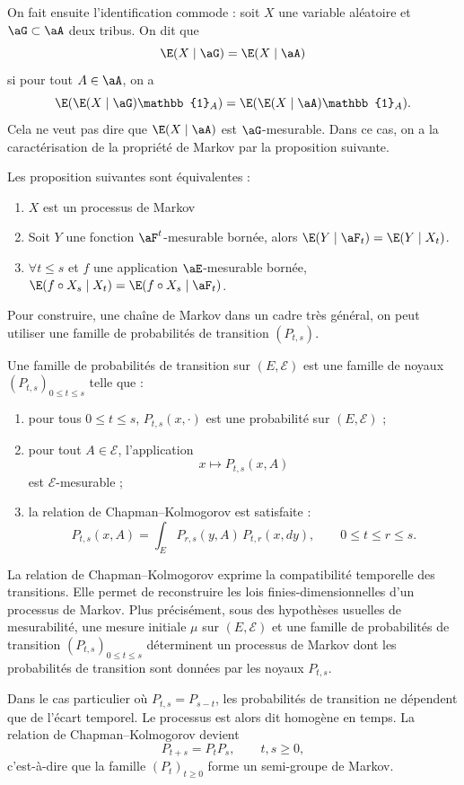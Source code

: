 On fait ensuite l'identification commode : soit $X$ une variable aléatoire et $\aG \subset \aA$ deux tribus. On dit que
\[
	\E(X \mid \aG) = \E(X \mid \aA)
\]
si pour tout $A \in \aA$, on a
\[
	\E(\E(X \mid \aG)\mathbb{1}_A) = \E(\E(X \mid \aA)\mathbb{1}_A).
\]
Cela ne veut pas dire que $\E(X \mid \aA)$ est $\aG$-mesurable. Dans ce cas, on a la caractérisation de la propriété de Markov par la proposition suivante.

\begin{prop}{}{}
	Les proposition suivantes sont équivalentes :
	\begin{enumerate}
		\item $X$ est un processus de Markov
		\item Soit $Y$ une fonction $\aF^t$-mesurable bornée, alors $\E(Y \mid \aF_t) = \E(Y \mid X_t)$.
		\item $\forall t \le s$ et $f$ une application $\aE$-mesurable bornée, $\E(f\circ X_s \mid X_t) = \E(f\circ X_s \mid \aF_t)$.
	\end{enumerate}
\end{prop}

Pour construire, une chaîne de Markov dans un cadre très général, on peut utiliser une famille de probabilités de transition $(P_{t,s})$.

\begin{defn}{}{}
	Une famille de probabilités de transition sur $(E,\mathcal E)$ est une famille de noyaux
	$(P_{t,s})_{0\le t\le s}$
	telle que :

	\begin{enumerate}
		\item pour tous $0\le t\le s$, $P_{t,s}(x,\cdot)$ est une probabilité sur $(E,\mathcal E)$ ;

		\item pour tout $A\in\mathcal E$, l'application
		      \[
			      x\longmapsto P_{t,s}(x,A)
		      \]
		      est $\mathcal E$-mesurable ;

		\item la relation de Chapman--Kolmogorov est satisfaite :
		      \[
			      P_{t,s}(x,A)
			      =
			      \int_E P_{r,s}(y,A)\,P_{t,r}(x,dy),
			      \qquad 0\le t\le r\le s.
		      \]
	\end{enumerate}
\end{defn}

La relation de Chapman--Kolmogorov exprime la compatibilité temporelle des transitions. Elle permet de reconstruire les lois finies-dimensionnelles d'un processus de Markov. Plus précisément, sous des hypothèses usuelles de mesurabilité, une mesure initiale $\mu$ sur $(E,\mathcal E)$ et une famille de probabilités de transition $(P_{t,s})_{0\le t\le s}$ déterminent un processus de Markov dont les probabilités de transition sont données par les noyaux $P_{t,s}$.

\medskip

Dans le cas particulier où $P_{t,s}=P_{s-t}$,
les probabilités de transition ne dépendent que de l'écart temporel. Le processus est alors dit homogène en temps. La relation de Chapman--Kolmogorov devient
\[
	P_{t+s}=P_tP_s,
	\qquad t,s\ge0,
\]
c'est-à-dire que la famille $(P_t)_{t\ge0}$ forme un semi-groupe de Markov.
